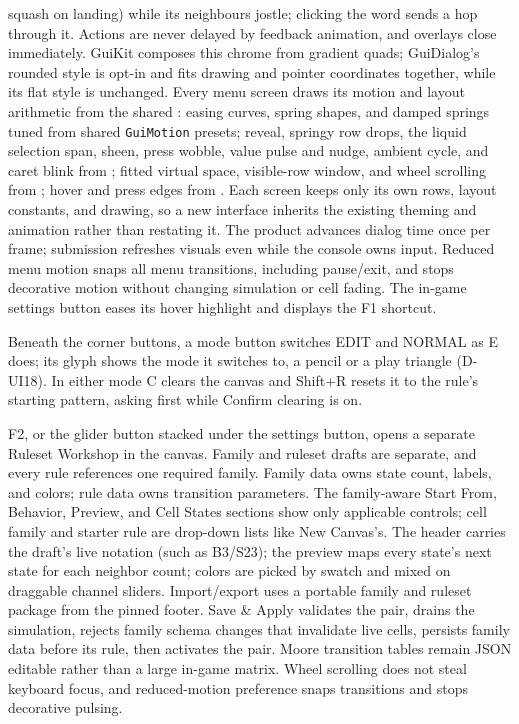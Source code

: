 squash on landing) while its neighbours jostle; clicking the word sends a hop
through it.
Actions are never delayed by feedback animation, and overlays close
immediately. GuiKit composes this chrome from  gradient
quads; GuiDialog's rounded style is opt-in and fits drawing and pointer
coordinates together, while its flat style is unchanged. Every menu screen
draws its motion and layout arithmetic from the shared
: easing curves, spring shapes, and damped springs
tuned from shared \texttt{GuiMotion} presets; reveal, springy row drops, the
liquid selection span, sheen, press wobble, value pulse and nudge, ambient
cycle, and caret blink from ; fitted virtual space,
visible-row window, and wheel scrolling from ; hover
and press edges from . Each screen keeps only its
own rows, layout constants, and drawing, so a new interface inherits the
existing theming and animation rather than restating it. The product advances dialog
time once per frame; submission refreshes visuals even while the console owns
input. Reduced menu motion snaps all menu transitions, including pause/exit,
and stops decorative motion without changing simulation or cell fading. The in-game
settings button eases its hover highlight and displays the F1 shortcut.

Beneath the corner buttons, a mode button switches EDIT and NORMAL as E does;
its glyph shows the mode it switches to, a pencil or a play triangle (D-UI18).
In either mode C clears the canvas and Shift+R resets it to the rule's
starting pattern, asking first while Confirm clearing is on.

F2, or the glider button stacked under the settings button, opens a separate
Ruleset Workshop in the canvas. Family and ruleset drafts are separate, and
every rule references one required family. Family data owns state count,
labels, and colors; rule data owns transition parameters. The family-aware
Start From, Behavior, Preview, and Cell States sections show only applicable
controls; cell family and starter rule are drop-down lists like New Canvas's. The header carries the draft's live notation (such as B3/S23); the
preview maps every state's next state for each neighbor count; colors are
picked by swatch and mixed on draggable channel sliders. Import/export uses a
portable family and ruleset package from the pinned footer. Save \& Apply validates the pair, drains the simulation,
rejects family schema changes that invalidate live cells, persists family data
before its rule, then activates the pair. Moore transition tables remain JSON
editable rather than a large in-game matrix. Wheel scrolling does not steal
keyboard focus, and reduced-motion preference snaps transitions and stops
decorative pulsing.


